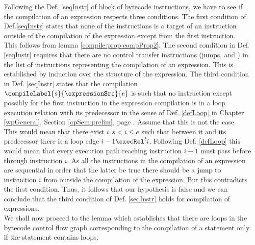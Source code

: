 Following the Def. \ref{seqInstr} of block of bytecode instructions,  we have to see if the compilation of an expression respects
three conditions.
The first condition of Def.\ref{seqInstr} states that none of the instructions is a target of an instruction
outside of the compilation of the expression except from the first instruction. This follows from lemma \ref{compile:prop:compProp2}. 
The second condition in Def. \ref{seqInstr}  requires that there are no control 
transfer instructions (jumps, \return and \athrow)  in the list of instructions representing the  compilation of an expression.
This is established by induction over the structure of the expression.
The third condition in Def. \ref{seqInstr} states that  the compilation $\compileLabel{s}{\expressionSrc}{e}$ is such that 
no instruction except possibly for the first instruction in the expression compilation is in a loop execution relation with its predecessor in the sense of 
Def.  \ref{defLoop} in Chapter \ref{wpGeneral}, Section \ref{opSem:prelim}, page \pageref{opSem:prelim}.
Assume that this is not the case. This would mean that there exist $i, s < i \le e  $  such that between it and its predecessor there is a loop edge
 $ i-1 \execRel^{l} i$.  Following Def. \ref{defLoop}  this would mean that every execution path reaching instruction $i-1$  must pass before through instruction $i$.
As all the instructions in the compilation of an expression are sequential in order that the latter be true there should be a jump to instruction $i$ from outside
the compilation of the expression. But this contradicts the first condition. Thus, it follows that our hypothesis is false and we can conclude that the third condition 
of Def. \ref{seqInstr} holds for compilation of expressions.
 \Qed \\
 
We shall now proceed to the lemma which establishes that there are loops in the bytecode control flow graph corresponding to the compilation of a statement
only if the statement contains loops. 

